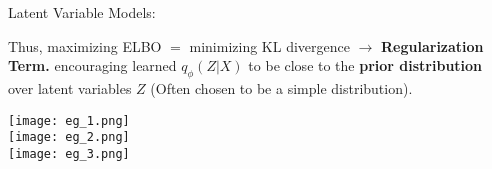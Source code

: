 \documentclass[twocolumn]{article}
\begin{document}
\begin{literaturepaper}{Latent Variable Models:}
\begin{enumerate}
    Thus, maximizing ELBO $=$ minimizing KL divergence $\rightarrow$ \textbf{Regularization Term.} encouraging learned $q_\phi(Z|X)$ to be close to the \textbf{prior distribution} over latent variables $Z$ (Often chosen to be a simple distribution).
\end{enumerate}

\texttt{[image: eg\_1.png]}\\

\texttt{[image: eg\_2.png]}\\

\texttt{[image: eg\_3.png]}\\



\end{literaturepaper}


\end{document}
